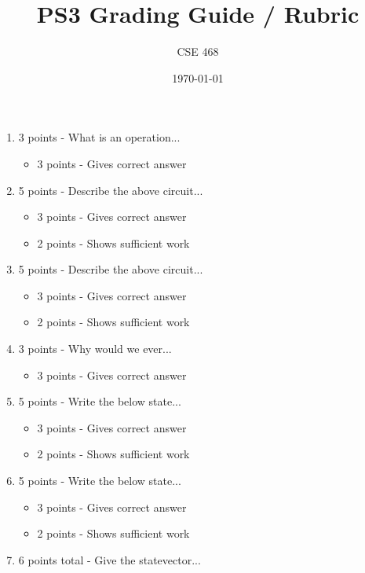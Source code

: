 \documentclass[12pt]{article}
\title{PS3 Grading Guide / Rubric}
\author{CSE 468}
\date{\today}
\begin{document}
\maketitle

\begin{enumerate}[font=\bfseries]
    \item 3 points - What is an operation...
        \begin{itemize}
            \item 3 points - Gives correct answer
        \end{itemize}
    \item 5 points - Describe the above circuit...
        \begin{itemize}
            \item 3 points - Gives correct answer
            \item 2 points - Shows sufficient work
        \end{itemize}
    \item 5 points - Describe the above circuit...
        \begin{itemize}
            \item 3 points - Gives correct answer
            \item 2 points - Shows sufficient work
        \end{itemize}
    \item 3 points - Why would we ever...
        \begin{itemize}
            \item 3 points - Gives correct answer
        \end{itemize}
    \item 5 points - Write the below state...
        \begin{itemize}
            \item 3 points - Gives correct answer
            \item 2 points - Shows sufficient work
        \end{itemize}
    \item 5 points - Write the below state...
        \begin{itemize}
            \item 3 points - Gives correct answer
            \item 2 points - Shows sufficient work
        \end{itemize}
    \item 6 points total - Give the statevector...
        \begin{enumerate}

\end{enumerate}
\end{enumerate}
\end{document}

